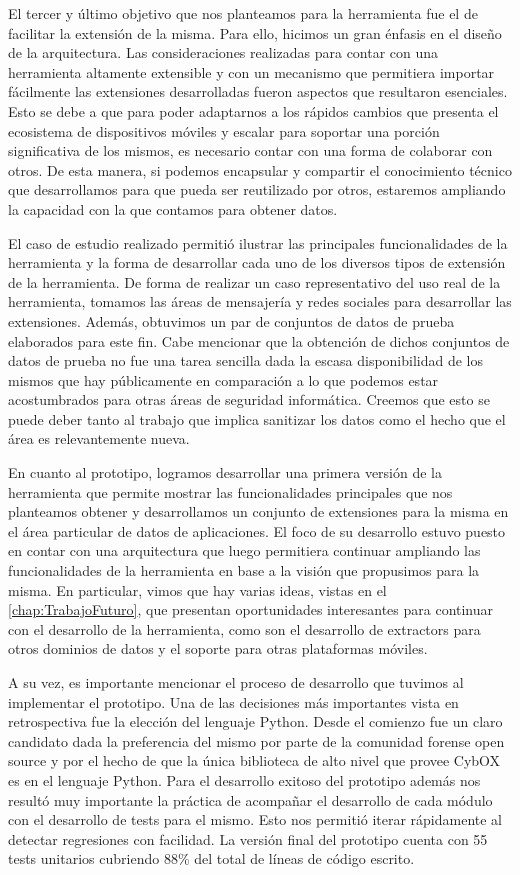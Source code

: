 El tercer y último objetivo que nos planteamos para la herramienta fue el de facilitar la extensión de la misma. Para ello, hicimos un gran énfasis en el diseño de la arquitectura. Las consideraciones realizadas para contar con una herramienta altamente extensible y con un mecanismo que permitiera importar fácilmente las extensiones desarrolladas fueron aspectos que resultaron esenciales. Esto se debe a que para poder adaptarnos a los rápidos cambios que presenta el ecosistema de dispositivos móviles y escalar para soportar una porción significativa de los mismos, es necesario contar con una forma de colaborar con otros. De esta manera, si podemos encapsular y compartir el conocimiento técnico que desarrollamos para que pueda ser reutilizado por otros, estaremos ampliando la capacidad con la que contamos para obtener datos.

El caso de estudio realizado permitió ilustrar las principales funcionalidades de la herramienta y la forma de desarrollar cada uno de los diversos tipos de extensión de la herramienta. De forma de realizar un caso representativo del uso real de la herramienta, tomamos las áreas de mensajería y redes sociales para desarrollar las extensiones. Además, obtuvimos un par de conjuntos de datos de prueba elaborados para este fin. Cabe mencionar que la obtención de dichos conjuntos de datos de prueba no fue una tarea sencilla dada la escasa disponibilidad de los mismos que hay públicamente en comparación a lo que podemos estar acostumbrados para otras áreas de seguridad informática. Creemos que esto se puede deber tanto al trabajo que implica sanitizar los datos como el hecho que el área es relevantemente nueva.

En cuanto al prototipo, logramos desarrollar una primera versión de la herramienta que permite mostrar las funcionalidades principales que nos planteamos obtener y desarrollamos un conjunto de extensiones para la misma en el área particular de datos de aplicaciones. El foco de su desarrollo estuvo puesto en contar con una arquitectura que luego permitiera continuar ampliando las funcionalidades de la herramienta en base a la visión que propusimos para la misma. En particular, vimos que hay varias ideas, vistas en el \autoref{chap:TrabajoFuturo}, que presentan oportunidades interesantes para continuar con el desarrollo de la herramienta, como son el desarrollo de extractors para otros dominios de datos y el soporte para otras plataformas móviles.

A su vez, es importante mencionar el proceso de desarrollo que tuvimos al implementar el prototipo. Una de las decisiones más importantes vista en retrospectiva fue la elección del lenguaje Python. Desde el comienzo fue un claro candidato dada la preferencia del mismo por parte de la comunidad forense open source y por el hecho de que la única biblioteca de alto nivel que provee CybOX es en el lenguaje Python. Para el desarrollo exitoso del prototipo además nos resultó muy importante la práctica de acompañar el desarrollo de cada módulo con el desarrollo de tests para el mismo. Esto nos permitió iterar rápidamente al detectar regresiones con facilidad. La versión final del prototipo cuenta con 55 tests unitarios cubriendo 88\% del total de líneas de código escrito.


